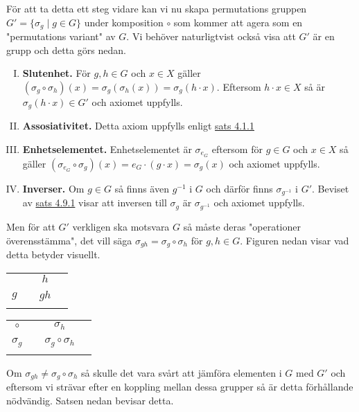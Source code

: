 \documentclass{article}
\theoremstyle{definition}
\begin{document}
För att ta detta ett steg vidare kan vi nu skapa permutations gruppen 
$G' = \{\sigma_g \; | \; g \in G\}$ under komposition $\circ$ som kommer att agera som 
en "permutations variant" av $G$. Vi behöver naturligtvist också visa att $G'$ är en grupp
och detta görs nedan. 
\begin{enumerate}[I)]
  \item \textbf{Slutenhet.} För $g, h \in G$ och $x \in X$ gäller 
  $(\sigma_g \circ \sigma_h) (x) = \sigma_g(\sigma_h(x)) = \sigma_g(h \cdot x)$. Eftersom 
  $h \cdot x \in X$ så är $\sigma_g(h \cdot x) \in G'$ och axiomet uppfylls.
  \item \textbf{Assosiativitet.} Detta axiom uppfylls enligt \hyperlink{ass}{sats 4.1.1}
  \item \textbf{Enhetselementet.} Enhetselementet är $\sigma_{e_G}$ eftersom för 
  $g \in G$ och $x \in X$ så gäller $(\sigma_{e_G} \circ \sigma_g) (x) = 
  e_G \cdot (g \cdot x) = \sigma_g(x)$ och axiomet uppfylls. 
  \item \textbf{Inverser.} Om $g \in G$ så finns även $g^{-1}$ i $G$ och därför finns 
  $\sigma_{g^{-1}}$ i $G'$. Beviset av \hyperlink{sats4.9.1}{sats 4.9.1} visar 
  att inversen till $\sigma_g$ är $\sigma_{g^{-1}}$ och axiomet uppfylls. 
\end{enumerate}
Men för att $G'$ verkligen ska motsvara $G$ så måste deras "operationer överensstämma", det 
vill säga $\sigma_{gh} = \sigma_g \circ \sigma_h$ för $g, h \in G$.
Figuren nedan visar vad detta betyder visuellt.

\begin{center}{}
  \begin{tabular}{c | c c c}
     &  & $h$ &\\
    \cline{1-4}
    &  &  & \\
    $g$ &  & $gh$ & \\
    &  &  & \\
  \end{tabular} 
  \quad
  \quad
  \begin{tabular}{c | c c c}
    $\circ$ &  & $\sigma_h$ &\\
    \cline{1-4}
    &  &  & \\
    $\sigma_g$ &  & $\sigma_g \circ \sigma_h$ & \\
    &  &  & \\
  \end{tabular} 
\end{center}
Om $\sigma_{gh} \neq \sigma_g \circ \sigma_h$ så skulle det vara svårt att jämföra elementen i 
$G$ med $G'$ och eftersom vi strävar efter en koppling mellan dessa grupper så
är detta förhållande nödvändig. Satsen nedan bevisar detta. 
\end{document}
